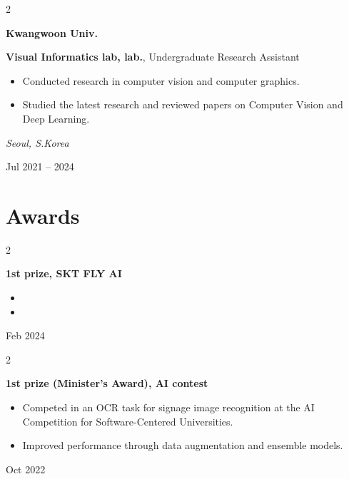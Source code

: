 \documentclass[10pt, letterpaper]{article}
\newenvironment{highlights}{
    \begin{itemize}[
        topsep=0.10 cm,
        parsep=0.10 cm,
        partopsep=0pt,
        itemsep=0pt,
        leftmargin=0.4 cm + 10pt
    ]
}{
    \end{itemize}
} %
\newenvironment{twocolentry}[2][]{
    \onecolentry
    \def\secondColumn{#2}
    \setcolumnwidth{\fill, 4.5 cm}
    \begin{paracol}{2}
}{
    \switchcolumn \raggedleft \secondColumn
    \end{paracol}
    \endonecolentry
} %
\begin{document}
        \vspace{0.2 cm}


        \begin{twocolentry}{
            \small\textit{Seoul, S.Korea}
            
            \vspace{0.1cm}
            
            Jul 2021 – 2024
        }
            \textbf{\color{headingOrange}Kwangwoon Univ.}
                
            \vspace{0.2cm}
            
            \textbf{Visual Informatics lab, lab.}, Undergraduate Research Assistant
            \begin{highlights}
                \item Conducted research in computer vision and computer graphics.
                \item Studied the latest research and reviewed papers on Computer Vision and Deep Learning.
            \end{highlights}
        \end{twocolentry}
        
        \vspace{0.2 cm}

        
        \section{Awards}

            \begin{twocolentry}{
                Feb 2024
            }
                \textbf{1st prize, SKT FLY AI}
                \begin{highlights}
                    \item
                    \item
                \end{highlights}
            \end{twocolentry}
        
            \vspace{0.2 cm}
            

            \begin{twocolentry}{
                Oct 2022
            }
                \textbf{1st prize (Minister's Award), AI contest}
                \begin{highlights}
                    \item Competed in an OCR task for signage image recognition at the AI Competition for Software-Centered Universities.
                    \item Improved performance through data augmentation and ensemble models.
                \end{highlights}
            \end{twocolentry}
        
\end{document}
